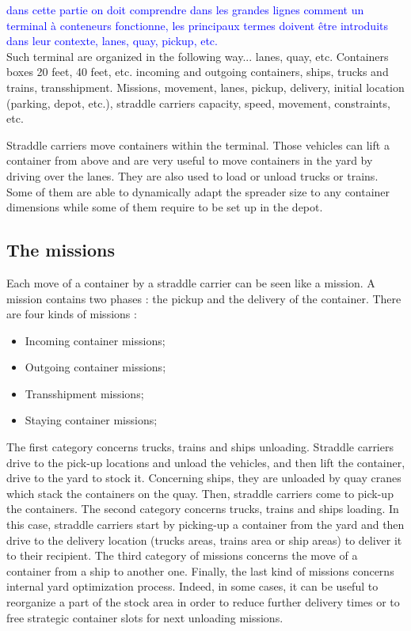 \documentclass[a4paper,10pt]{article}
\begin{document}
% 
\vspace{1cm}
\textcolor{blue}{dans cette partie on doit comprendre dans les grandes lignes comment un terminal à conteneurs fonctionne, les principaux termes doivent être introduits dans leur contexte, lanes, quay, pickup, etc.} \\
Such terminal are organized in the following way... lanes, quay, etc. Containers boxes 20 feet, 40 feet, etc. incoming and outgoing containers, ships, trucks and trains, transshipment. Missions, movement, lanes, pickup, delivery, initial location (parking, depot, etc.), straddle carriers capacity, speed, movement, constraints, etc.


Straddle carriers move containers within the terminal. Those vehicles can lift a container from above and are very useful to move containers in the yard by driving over the lanes. They are also used to load or unload trucks or trains. Some of them are able to dynamically adapt the spreader size to any container dimensions while some of them require to be set up in the depot.%
\subsection{The missions}
Each move of a container by a straddle carrier can be seen like a mission. A mission contains two phases : the pickup and the delivery of the container. There are four kinds of missions :
\begin{itemize}
	\item Incoming container missions;
	\item Outgoing container missions;
	\item Transshipment missions;
	\item Staying container missions;
\end{itemize}

The first category concerns trucks, trains and ships unloading. Straddle carriers drive to the pick-up locations and unload the vehicles, and then lift the container, drive to the yard to stock it. Concerning ships, they are unloaded by quay cranes which stack the containers on the quay. Then, straddle carriers come to pick-up the containers.
The second category concerns trucks, trains and ships loading. In this case, straddle carriers start by picking-up a container from the yard and then drive to the delivery location (trucks areas, trains area or ship areas) to deliver it to their recipient. 
The third category of missions concerns the move of a container from a ship to another one.
Finally, the last kind of missions concerns internal yard optimization process. Indeed, in some cases, it can be useful to reorganize a part of the stock area in order to reduce further delivery times or to free strategic container slots for next unloading missions.
\end{document}
